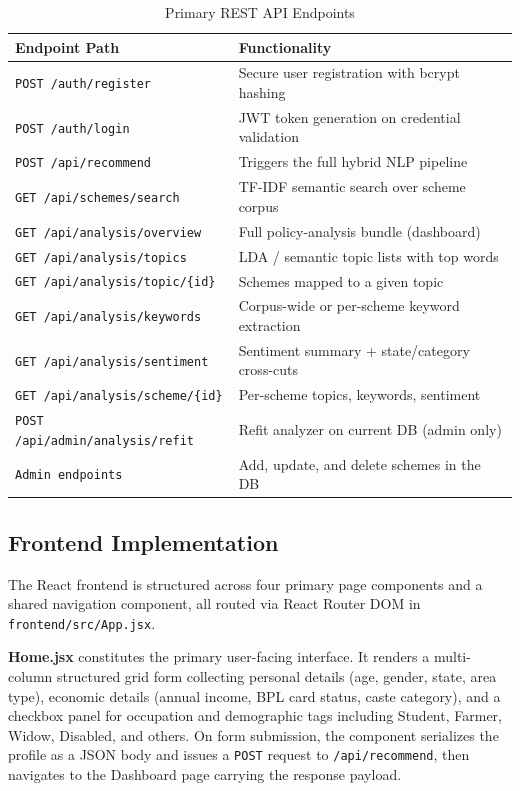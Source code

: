 \documentclass[10pt, journal, twocolumn]{IEEEtran}
\begin{document}
\begin{table}[htbp]
\centering
\caption{Primary REST API Endpoints}
\label{tab:api_routes}
\begin{tabularx}{\linewidth}{@{}l X@{}}
\toprule
\textbf{Endpoint Path} & \textbf{Functionality} \\
\midrule
\texttt{POST /auth/register} & Secure user registration with bcrypt hashing \\
\texttt{POST /auth/login} & JWT token generation on credential validation \\
\texttt{POST /api/recommend} & Triggers the full hybrid NLP pipeline \\
\texttt{GET /api/schemes/search} & TF-IDF semantic search over scheme corpus \\
\texttt{GET /api/analysis/overview} & Full policy-analysis bundle (dashboard) \\
\texttt{GET /api/analysis/topics} & LDA / semantic topic lists with top words \\
\texttt{GET /api/analysis/topic/\{id\}} & Schemes mapped to a given topic \\
\texttt{GET /api/analysis/keywords} & Corpus-wide or per-scheme keyword extraction \\
\texttt{GET /api/analysis/sentiment} & Sentiment summary + state/category cross-cuts \\
\texttt{GET /api/analysis/scheme/\{id\}} & Per-scheme topics, keywords, sentiment \\
\texttt{POST /api/admin/analysis/refit} & Refit analyzer on current DB (admin only) \\
\texttt{Admin endpoints} & Add, update, and delete schemes in the DB \\
\bottomrule
\end{tabularx}
\end{table}

\subsection{Frontend Implementation}
The React frontend \cite{react} is structured across four primary page components and a shared navigation component, all routed via React Router DOM in \texttt{frontend/src/App.jsx}.

\textbf{Home.jsx} constitutes the primary user-facing interface. It renders a multi-column structured grid form collecting personal details (age, gender, state, area type), economic details (annual income, BPL card status, caste category), and a checkbox panel for occupation and demographic tags including Student, Farmer, Widow, Disabled, and others. On form submission, the component serializes the profile as a JSON body and issues a \texttt{POST} request to \texttt{/api/recommend}, then navigates to the Dashboard page carrying the response payload.
\end{document}
